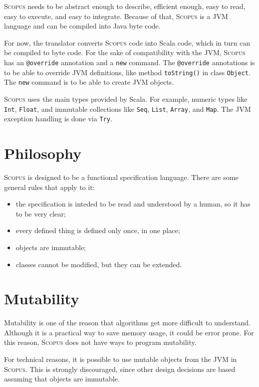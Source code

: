 \documentclass[12pt,a4paper]{book}
\makeatletter
\newcommand{\srccode}[1]{\texttt{{#1}}}
\newcommand{\reservedWord}[1]{{\color{blue}\srccode{#1}}\xspace}
\newcommand{\annotation}[1]{{\color{brown}\srccode{#1}}\xspace}
\newcommand{\snew}{\reservedWord{new}}
\newcommand{\soverride}{\annotation{@override}}
\newcommand{\Scopus}{\textsc{Scopus}\xspace}
\makeatother
\begin{document}
    \Scopus needs to be abstract enough to describe, efficient enough, easy to read, easy to execute, and easy to integrate.
    Because of that, \Scopus is a JVM language and can be compiled into Java byte code.

    For now, the translator converts \Scopus code into Scala code, which in turn can be compiled to byte code.
    For the sake of compatibility with the JVM, \Scopus has an \soverride annotation and a \snew command.
    The \soverride annotations is to be able to override JVM definitions, like method \srccode{toString()} in class \srccode{Object}.
    The \snew command is to be able to create JVM objects.

    \Scopus uses the main types provided by Scala.
    For example, numeric types like \srccode{Int}, \srccode{Float}, and immutable collections like \srccode{Seq}, \srccode{List}, \srccode{Array}, and \srccode{Map}.
    The JVM exception handling is done via \srccode{Try}.


    \section{Philosophy}

    \Scopus is designed to be a functional specification language.
    There are some general rules that apply to it:

    \begin{itemize}
        \item the specification is inteded to be read and understood by a human, so it has to be very clear;
        \item every defined thing is defined only once, in one place;
        \item objects are immutable;
        \item classes cannot be modified, but they can be extended.
    \end{itemize}


    \section{Mutability}

    Mutability is one of the reason that algorithms get more difficult to understand.
    Although it is a practical way to save memory usage, it could be error prone.
    For this reason, \Scopus does not have ways to program mutability.

    For technical reasons, it is possible to use mutable objects from the JVM in \Scopus.
    This is strongly discouraged, since other design decisions are based assuming that objects are immutable.
\end{document}
